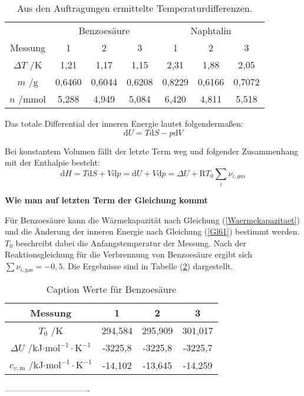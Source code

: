 \documentclass[12pt,a4paper,titlepage,headinclude,bibtotoc]{scrartcl}
\begin{document}
\begin{table} \label{TabDeltaT}\caption{Aus den Auftragungen ermittelte Temperaturdifferenzen.}
\begin{tabular}{c|c|c|c|c|c|c}
&\multicolumn{3}{c|}{Benzoesäure} & \multicolumn{3}{c}{Naphtalin}\\ 
Messung& 1&2&3&1&2&3\\
\hline 
$\Delta T$ /K & 1,21 & 1,17 & 1,15 & 2,31 & 1,88 & 2,05 \\ 
$m$ /g&0,6460&0,6044&0,6208&0,8229&0,6166&0,7072\\
$n$ /mmol& 5,288&4,949&5,084&6,420&4,811&5,518\\
\end{tabular} 
\end{table}
\FloatBarrier



Das totale Differential der inneren Energie lautet folgendermaßen:\\

\begin{equation}
\mathrm{d}U= T\mathrm{d}S - p\mathrm{d}V
\end{equation} 

Bei konstantem Volumen fällt der letzte Term weg und folgender Zusammenhang mit der Enthalpie besteht:\\

\begin{equation} \label{Gl61}
\mathrm{d}H= T\mathrm{d}S + V\mathrm{d}p = \mathrm{d}U + V\mathrm{d}p = \Delta U +\mathrm{R}T_0\sum_i \nu_{i,gas}
\end{equation}

\textbf{Wie man auf letzten Term der Gleichung kommt}

Für Benzoesäure kann die Wärmekapazität nach Gleichung (\ref{Waermekapazitaet}) und die Änderung der inneren Energie nach Gleichung (\ref{Gl61}) bestimmt werden. $T_0$ beschreibt dabei die Anfangstemperatur der Messung. Nach der Reaktionsgleichung für die Verbrennung von Benzoesäure ergibt sich $\sum \nu_{i,\mathrm{gas}}= -0,5$. Die Ergebnisse sind in Tabelle (\ref{TabDeltaT}) dargestellt.\\

\begin{table} \label{TabDeltaT}\caption{Caption Werte für Benzoesäure}
\begin{tabular}{c|c|c|c}
Messung& 1&2&3\\
\hline 
$T_0$ /K&294,584&295,909&301,017\\
$\Delta U$ /kJ$\cdot \mathrm{mol}^{-1} \cdot \mathrm{K}^{-1}$&
-3225,8&-3225,8&-3225,7\\
$c_{v,\mathrm{m}}$ /kJ$\cdot \mathrm{mol}^{-1} \cdot \mathrm{K}^{-1}$&-14,102&-13,645&-14,259\\
\end{tabular} 
\end{table}
\FloatBarrier
-------------------------------\\
\end{document}
